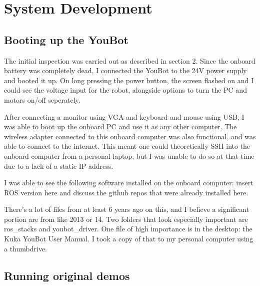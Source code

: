 \documentclass[a4paper, 12pt]{article}
\newif\ifshownotes
\newcommand{\notes}[1]{\ifshownotes\textcolor{blue}{#1}\fi}
\begin{document}
    \pagebreak

    \section{System Development}
    \subsection{Booting up the YouBot}

    \notes{describe the booting up process here, what ports to use, how to connect to the onboard computer, etc.}

    \notes{furthermore describe issues with software that needed to be fixed, such as the bashrc file, the networking, etc.}

    The initial inspection was carried out as described in section 2. Since the onboard battery was completely dead, I connected the YouBot to the 24V power supply and booted it up. On long pressing the power button, the screen flashed on and I could see the voltage input for the robot, alongside options to turn the PC and motors on/off seperately. 

    After connecting a monitor using VGA and keyboard and mouse using USB, I was able to boot up the onboard PC and use it as any other computer. The wireless adapter connected to this onboard computer was also functional, and was able to connect to the internet. This meant one could theoretically SSH into the onboard computer from a personal laptop, but I was unable to do so at that time due to a lack of a static IP address.


    
    I was able to see the following software installed on the onboard computer: insert ROS version here and discuss the github repos that were already installed here. 

    There’s a lot of files from at least 6 years ago on this, and I believe a significant portion are from like 2013 or 14. Two folders that look especially important are ros\_stacks and youbot\_driver. One file of high importance is in the desktop: the Kuka YouBot User Manual. I took a copy of that to my personal computer using a thumbdrive.  
    
    \notes{discuss powering up, initial software inspection, static IP issue}
    
    
    \pagebreak

    \subsection{Running original demos}
    \notes{describe fixing network issue, and hten running the original demos.}
\end{document}
